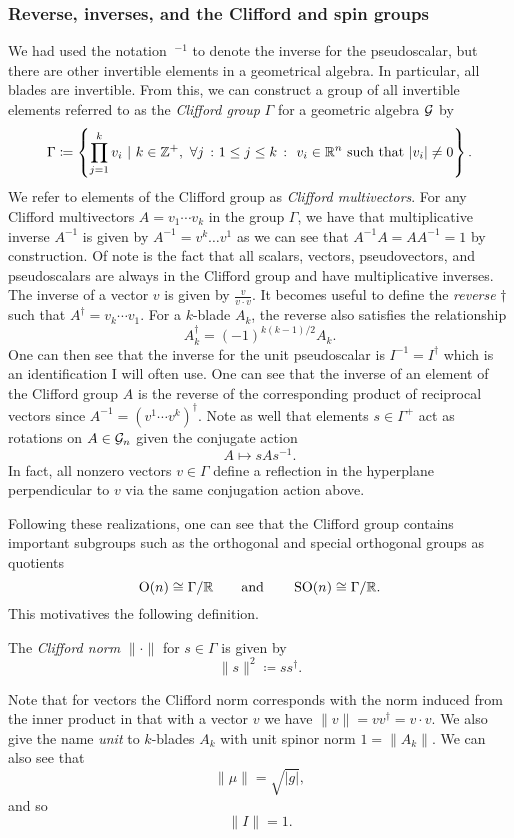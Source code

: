 \subsubsection{Reverse, inverses, and the Clifford and spin groups}

We had used the notation $~^{-1}$ to denote the inverse for the pseudoscalar, but there are other invertible elements in a geometrical algebra.  In particular, all blades are invertible. From this, we can construct a group of all invertible elements referred to as the \emph{Clifford group} $\Gamma$ for a geometric algebra $\mathcal{G}$ by
\[
\Gamma \coloneqq \left\{ \prod_{j=1}^k v_i ~\vert~ k\in \mathbb{Z}^+,~ \forall j~\colon1\leq j \leq k~\colon~v_i \in \mathbb{R}^n ~\textrm{such that}~|v_i|\neq 0\right\}.
\]
We refer to elements of the Clifford group as \emph{Clifford multivectors}. For any Clifford multivectors $A = v_1 \cdots v_k$ in the group $\Gamma$, we have that multiplicative inverse $A^{-1}$ is given by $A^{-1} = v^k \dots v^1$ as we can see that $A^{-1}A=AA^{-1} = 1$ by construction.  Of note is the fact that all scalars, vectors, pseudovectors, and pseudoscalars are always in the Clifford group and have multiplicative inverses. The inverse of a vector $v$ is given by $\frac{v}{v\cdot v}$. It becomes useful to define the \emph{reverse} $\dagger$ such that $A^\dagger = v_k \cdots v_1$. For a $k$-blade $A_k$, the reverse also satisfies the relationship
\begin{equation}
\label{eq:reverse_sign}
A_k^\dagger = (-1)^{k(k-1)/2} A_k.
\end{equation}
One can then see that the inverse for the unit pseudoscalar is $I^{-1}=I^\dagger$ which is an identification I will often use. One can see that the inverse of an element of the Clifford group $A$ is the reverse of the corresponding product of reciprocal vectors since $A^{-1} = (v^1 \cdots v^k)^\dagger$. Note as well that elements $s \in \Gamma^+$ act as rotations on $A\in \mathcal{G}_n$ given the conjugate action
\[
A \mapsto s A s^{-1}.
\]
In fact, all nonzero vectors $v\in\Gamma$ define a reflection in the hyperplane perpendicular to $v$ via the same conjugation action above.

Following these realizations, one can see that the Clifford group contains important subgroups such as the orthogonal and special orthogonal groups as quotients
\[
\operatorname{O}(n) \cong \Gamma/\mathbb{R} \qquad \textrm{and} \qquad \operatorname{SO}(n) \cong \Gamma /\mathbb{R}.
\]
This motivatives the following definition.
\begin{definition}
    The \emph{Clifford norm} $\| \cdot \|$ for $s \in \Gamma$ is given by
    \[
    \|s\|^2 \coloneqq ss^\dagger.
    \]  
\end{definition}
Note that for vectors the Clifford norm corresponds with the norm induced from the inner product in that with a vector $v$ we have $\|v\|=vv^\dagger = v\cdot v$. We also give the name \emph{unit} to $k$-blades $A_k$ with unit spinor norm $1=\|A_k\|$. We can also see that 
\begin{equation}
\label{eq:pseudoscalar_norm}
\|\mu\| = \sqrt{|g|},
\end{equation}
and so
\[
\|I\| = 1.
\]

